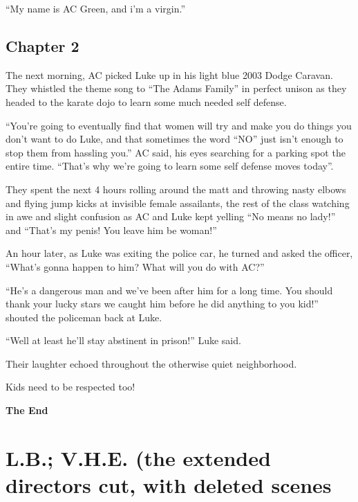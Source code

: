 ``My name is AC Green, and i'm a virgin.''



\section*{Chapter 2}

The next morning, AC picked Luke up in his light blue 2003 Dodge
Caravan. They whistled the theme song to ``The Adams
Family'' in perfect unison as they headed to the karate dojo
to learn some much needed self defense.



``You're going to eventually find that women will try
and make you do things you don't want to do Luke, and that
sometimes the word ``NO'' just isn't enough to stop
them from hassling you.'' AC said, his eyes searching for a
parking spot the entire time. ``That's why we're
going to learn some self defense moves today''.



They spent the next 4 hours rolling around the matt and throwing
nasty elbows and flying jump kicks at invisible female assailants,
the rest of the class watching in awe and slight confusion as AC
and Luke kept yelling ``No means no lady!'' and
``That's my penis! You leave him be woman!''



An hour later, as Luke was exiting the police car, he turned and
asked the officer, ``What's gonna happen to him? What
will you do with AC?''



``He's a dangerous man and we've been after him for a long
time. You should thank your lucky stars we caught him before he did
anything to you kid!'' shouted the policeman back at
Luke.



``Well at least he'll stay abstinent in prison!''
Luke said.



Their laughter echoed throughout the otherwise quiet
neighborhood.



Kids need to be respected too!

{\bf The End} 
 



\chapter[L.B.; V.H.E.]{L.B.; V.H.E. (the extended directors cut,
with deleted scenes}


